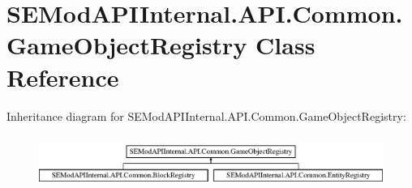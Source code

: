 \hypertarget{class_s_e_mod_a_p_i_internal_1_1_a_p_i_1_1_common_1_1_game_object_registry}{}\section{S\+E\+Mod\+A\+P\+I\+Internal.\+A\+P\+I.\+Common.\+Game\+Object\+Registry Class Reference}
\label{class_s_e_mod_a_p_i_internal_1_1_a_p_i_1_1_common_1_1_game_object_registry}
Inheritance diagram for S\+E\+Mod\+A\+P\+I\+Internal.\+A\+P\+I.\+Common.\+Game\+Object\+Registry\+:\begin{figure}[H]
\begin{center}
\leavevmode
\includegraphics[height=1.761006cm]{class_s_e_mod_a_p_i_internal_1_1_a_p_i_1_1_common_1_1_game_object_registry}
\end{center}
\end{figure}
